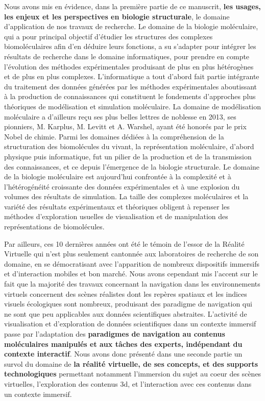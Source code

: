 {Nous avons mis en évidence, dans la première partie de ce manuscrit, \textbf{les usages, les enjeux et les perspectives en biologie structurale}, le domaine d'application de nos travaux de recherche. Le domaine de la biologie moléculaire, qui a pour principal objectif d'étudier les structures des complexes biomoléculaires afin d'en déduire leurs fonctions, a su s'adapter pour intégrer les résultats de recherche dans le domaine informatiques, pour prendre en compte l'évolution des méthodes expérimentales produisant de plus en plus hétérogènes et de plus en plus complexes. L'informatique a tout d'abord fait partie intégrante du traitement des données générées par les méthodes expérimentales aboutissant à la production de connaissances qui constituent le fondements d'approches plus théoriques de modélisation et simulation moléculaire. La domaine de modélisation moléculaire a d'ailleurs reçu ses plus belles lettres de noblesse en 2013, ses pionniers, M. Karplus, M. Levitt et A. Warshel, ayant été honorés par le prix Nobel de chimie.  Parmi les domaines dédiées à la compréhension de la structuration des biomolécules du vivant, la représentation moléculaire, d'abord physique puis informatique, fut un pilier de la production et de la transmission des connaissances, et ce depuis l'émergence de la biologie structurale. Le domaine de la biologie moléculaire est aujourd'hui confrontée à la complexité et à l'hétérogénéité croissante des données expérimentales et à une explosion du volumes des résultats de simulation. La taille des complexes moléculaires et la variété des résultats expérimentaux et théoriques obligent à repenser les méthodes d'exploration usuelles de visualisation et de manipulation des représentations de biomolécules.


Par ailleurs, ces 10 dernières années ont été le témoin de l'essor de la Réalité Virtuelle qui n'est plus seulement cantonnée aux laboratoires de recherche de son domaine, en se démocratisant avec l'apparition de nombreux dispositifs immersifs et d'interaction mobiles et bon marché. Nous avons cependant mis l'accent sur le fait que la majorité des travaux concernant la navigation dans les environnements virtuels concernent des scènes réalistes dont les repères spatiaux et les indices visuels écologiques sont nombreux, produisant des paradigme de navigation qui ne sont que peu applicables aux données scientifiques abstraites. L'activité de visualisation et d'exploration de données scientifiques dans un contexte immersif passe par l'adaptation des \textbf{paradigmes de navigation au contenus moléculaires manipulés et aux tâches des experts, indépendant du contexte interactif}.  Nous avons donc présenté dans une seconde partie un survol du domaine de \textbf{la réalité virtuelle, de ses concepts, et des supports technologiques} permettant notamment l'immersion du sujet au coeur des scènes virtuelles, l'exploration des contenus 3d, et l'interaction avec ces contenus dans un contexte immersif.


}
